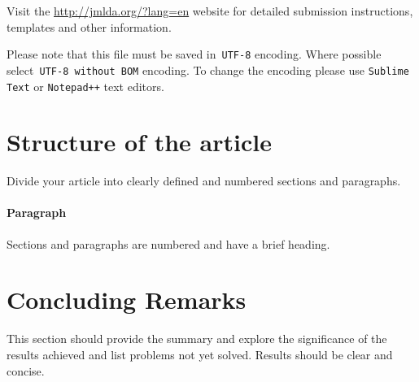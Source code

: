 \documentclass[12pt, twoside]{article}
\begin{document}
Visit the \url{http://jmlda.org/?lang=en} website for detailed submission instructions, templates and other information.

Please note that this file must be saved in~\verb'UTF-8' encoding. Where possible select~\verb'UTF-8 without BOM' encoding. 
To change the encoding please use \verb'Sublime Text' or \verb'Notepad++' text editors.

\section{Structure of the article}
\noindent
Divide your article into clearly defined and numbered sections and paragraphs.

\paragraph{Paragraph}
\noindent
Sections and paragraphs are numbered and have a brief heading.

\section{Concluding Remarks}
This section should provide the summary and explore the significance of the results achieved and list problems not yet solved.
Results should be clear and concise. 









\end{document}
